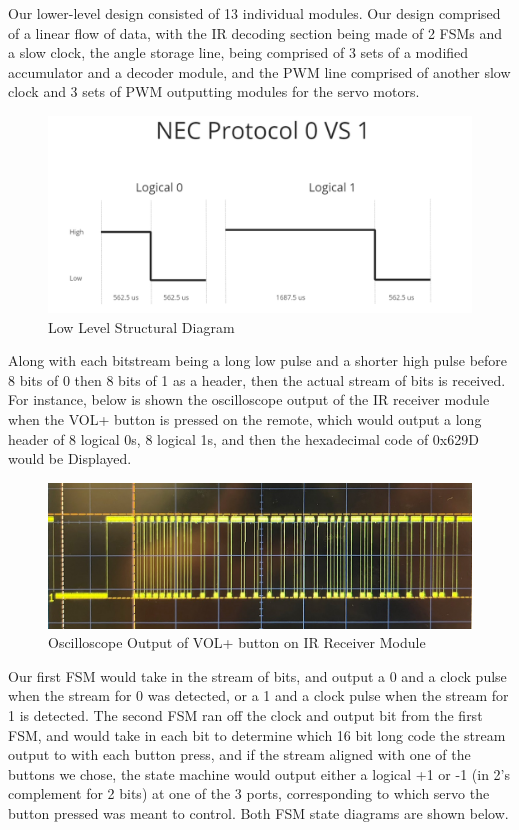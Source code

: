 \documentclass[
    a4paper, %
	12pt, %
    ]{CSSullivanBusinessReport}
\begin{document}
    Our lower-level design consisted of 13 individual modules. Our design comprised of a linear flow of data, with the IR decoding section being made of 2 FSMs and a slow clock, the angle storage line, being comprised of 3 sets of a modified accumulator and a decoder module, and the PWM line comprised of another slow clock and 3 sets of PWM outputting modules for the servo motors. 
    
    \begin{figure}[h]
        \centering
        \includegraphics[width=.8\textwidth]{Figures/NEC Protocol.png}
        \caption{Low Level Structural Diagram}
        \label{fig:lowlevelblockdiagram}
    \end{figure}

    Along with each bitstream being a long low pulse and a shorter high pulse before 8 bits of 0 then 8 bits of 1 as a header, then the actual stream of bits is received. For instance, below is shown the oscilloscope output of the IR receiver module when the VOL+ button is pressed on the remote, which would output a long header of 8 logical 0s, 8 logical 1s, and then the hexadecimal code of 0x629D would be Displayed.

    \begin{figure}[h]
        \centering
        \includegraphics[width=.8\textwidth]{Figures/Oscope Capture.jpg}
        \caption{Oscilloscope Output of VOL+ button on IR Receiver Module}
        \label{fig:lowlevelblockdiagram}
    \end{figure}

    \newpage
    Our first FSM would take in the stream of bits, and output a 0 and a clock pulse when the stream for 0 was detected, or a 1 and a clock pulse when the stream for 1 is detected. The second FSM ran off the clock and output bit from the first FSM, and would take in each bit to determine which 16 bit long code the stream output to with each button press, and if the stream aligned with one of the buttons we chose, the state machine would output either a logical +1 or -1 (in 2’s complement for 2 bits) at one of the 3 ports, corresponding to which servo the button pressed was meant to control. Both FSM state diagrams are shown below.
\end{document}
